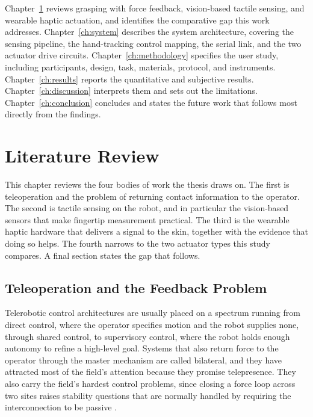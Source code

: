 \documentclass[12pt, a4paper, twoside, openright]{report}
\begin{document}
Chapter~\ref{ch:literature} reviews grasping with force feedback, vision-based
tactile sensing, and wearable haptic actuation, and identifies the comparative
gap this work addresses. Chapter~\ref{ch:system} describes the system
architecture, covering the sensing pipeline, the hand-tracking control mapping,
the serial link, and the two actuator drive circuits.
Chapter~\ref{ch:methodology} specifies the user study, including participants,
design, task, materials, protocol, and instruments. Chapter~\ref{ch:results}
reports the quantitative and subjective results. Chapter~\ref{ch:discussion}
interprets them and sets out the limitations. Chapter~\ref{ch:conclusion}
concludes and states the future work that follows most directly from the
findings.

\chapter{Literature Review}
\label{ch:literature}

This chapter reviews the four bodies of work the thesis draws on. The first is
teleoperation and the problem of returning contact information to the operator.
The second is tactile sensing on the robot, and in particular the vision-based
sensors that make fingertip measurement practical. The third is the wearable
haptic hardware that delivers a signal to the skin, together with the evidence
that doing so helps. The fourth narrows to the two actuator types this study
compares. A final section states the gap that follows.

\section{Teleoperation and the Feedback Problem}
\label{sec:lit-grasping}

Telerobotic control architectures are usually placed on a spectrum running
from direct control, where the operator specifies motion and the robot
supplies none, through shared control, to supervisory control, where the robot
holds enough autonomy to refine a high-level goal. Systems that also return
force to the operator through the master mechanism are called bilateral, and
they have attracted most of the field's attention because they promise
telepresence. They also carry the field's hardest control problems, since
closing a force loop across two sites raises stability questions that are
normally handled by requiring the interconnection to be passive
\cite{niemeyer2016}.
\end{document}
